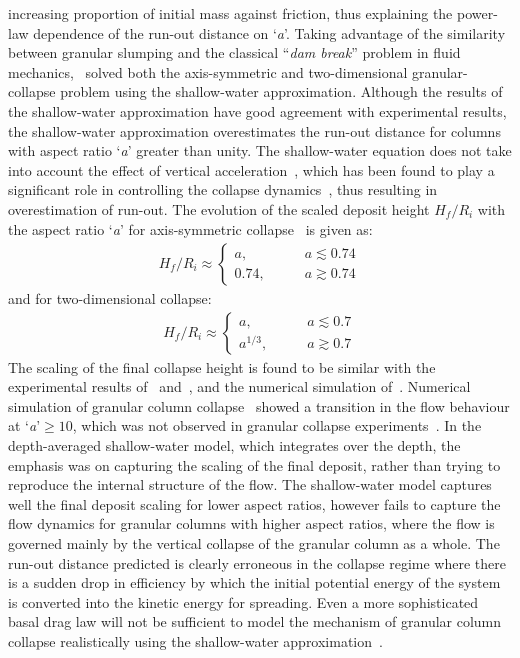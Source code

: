 increasing proportion of initial mass against friction, thus explaining the 
power-law dependence of the run-out distance on `\textit{a}'. Taking advantage 
of the similarity between granular slumping and the classical ``\textit{dam 
break}'' problem in fluid mechanics,~\citet{Kerswell2005dam} solved both the 
axis-symmetric and two-dimensional granular-collapse problem using the 
shallow-water approximation. Although the results of the shallow-water 
approximation have good agreement with experimental results, the shallow-water 
approximation overestimates the run-out distance for columns with aspect ratio 
`\textit{a}' greater than unity. The shallow-water equation does not take into 
account the effect of vertical acceleration~\citep{Lajeunesse2005}, which has 
been found to play a significant role in controlling the collapse 
dynamics~\citet{Staron2005}, thus resulting in overestimation of run-out. The 
evolution of the scaled deposit height 
$\textit{H}_{\textit{f}}/\textit{R}_{\textit{i}}$ with the aspect ratio 
`\textit{a}' for axis-symmetric collapse~\citep{Lajeunesse2005} is given as: 
\begin{align}
\textit{H}_{\textit{f}}/\textit{R}_{\textit{i}} \approx 
\begin{cases}
\textit{a}, \qquad &\textit{a}\lesssim 0.74 \\
0.74, \qquad &\textit{a}\gtrsim 0.74
\end{cases}
\end{align}
and for two-dimensional collapse:
\begin{align}
\textit{H}_{\textit{f}}/\textit{R}_{\textit{i}} \approx 
\begin{cases}
\textit{a}, \qquad &\textit{a}\lesssim 0.7 \\
\textit{a}^{1/3}, \qquad &\textit{a}\gtrsim 0.7
\end{cases}
\end{align}
The scaling of the final collapse height is found to be similar with the 
experimental results of~\citet{Lube2005} and~\citet{Balmforth2005}, and the 
numerical simulation of~\citet{Staron2005}. Numerical simulation of granular 
column collapse~\citep{Lacaze2008,Staron2005} showed a transition in the flow 
behaviour at `\textit{a}'$\ge 10$, which was not observed in granular collapse 
experiments~\citep{Balmforth2005,Lube2005,Lajeunesse2004}. In the 
depth-averaged shallow-water model, which integrates over the depth, the 
emphasis was on capturing the scaling of the final deposit, rather than trying 
to reproduce the internal structure of the flow. The shallow-water model 
captures well the final deposit scaling for lower aspect ratios, however fails 
to capture the flow dynamics for granular columns with higher aspect ratios, 
where the flow is governed mainly by the vertical collapse of the granular 
column as a whole. The run-out distance predicted is clearly erroneous in the 
collapse regime where there is a sudden drop in efficiency by which the initial 
potential energy of the system is converted into the kinetic energy for 
spreading. Even a more sophisticated basal drag law will not be sufficient to 
model the mechanism of granular column collapse realistically using the 
shallow-water approximation~\citep{Kerswell2005dam}.

